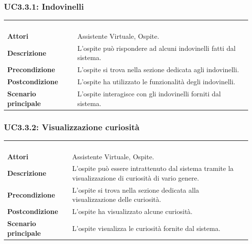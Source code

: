 \subsubsection{UC3.3.1: Indovinelli}
\label{UC3.3.1}
\begin{longtable}{l|p{10cm}}
\rowcolor[gray]{0.8} \multicolumn{2}{c}{} \\
\rowcolor[gray]{0.8} \multicolumn{2}{c}{\textbf{UC3.3.1 - Indovinelli}} \\
\rowcolor[gray]{0.8} \multicolumn{2}{c}{} \\
\hline
&\\
\textbf{Attori} & Assistente Virtuale, Ospite.\\[7pt]
\textbf{Descrizione} & L'ospite può rispondere ad alcuni indovinelli fatti dal sistema.\\[7pt]
\textbf{Precondizione} & L'ospite si trova nella sezione dedicata agli indovinelli.\\[7pt]
\textbf{Postcondizione} & L'ospite ha utilizzato le funzionalità degli indovinelli.\\[7pt]
\textbf{Scenario principale} &L'ospite interagisce con gli indovinelli forniti dal sistema.\\[7pt]\hline
\end{longtable}

\subsubsection{UC3.3.2: Visualizzazione curiosità}
\label{UC3.3.2}
\begin{longtable}{l|p{10cm}}
\rowcolor[gray]{0.8} \multicolumn{2}{c}{} \\
\rowcolor[gray]{0.8} \multicolumn{2}{c}{\textbf{UC3.3.2 - Visualizzazione curiosità}} \\
\rowcolor[gray]{0.8} \multicolumn{2}{c}{} \\
\hline
&\\
\textbf{Attori} & Assistente Virtuale, Ospite.\\[7pt]
\textbf{Descrizione} & L'ospite può essere intrattenuto dal sistema tramite la visualizzazione di curiosità di vario genere.\\[7pt]
\textbf{Precondizione} & L'ospite si trova nella sezione dedicata alla visualizzazione delle curiosità.\\[7pt]
\textbf{Postcondizione} & L'ospite ha visualizzato alcune curiosità.\\[7pt]
\textbf{Scenario principale} &L'ospite visualizza le curiosità fornite dal sistema.\\[7pt]\hline
\end{longtable}

